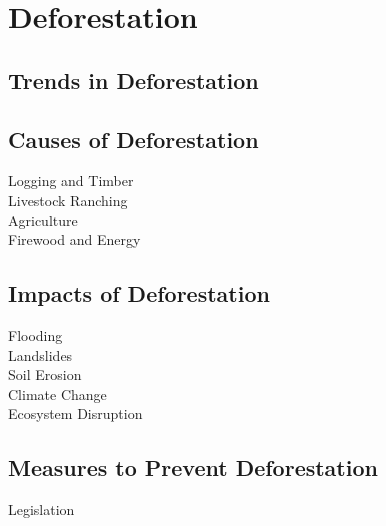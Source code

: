 \documentclass[../../main]{subfiles}
\begin{document}
\section{Deforestation}

\subsection{Trends in Deforestation}

\subsection{Causes of Deforestation}

	\begin{description}
		\item[Logging and Timber]
		\item[Livestock Ranching]
		\item[Agriculture]
		\item[Firewood and Energy]
	\end{description}

\subsection{Impacts of Deforestation}

	\begin{description}
		\item[Flooding]
		\item[Landslides]
		\item[Soil Erosion]
		\item[Climate Change]
		\item[Ecosystem Disruption]
	\end{description}

\subsection{Measures to Prevent Deforestation}

	\begin{description}
		\item[Legislation]
	\end{description}
\end{document}
